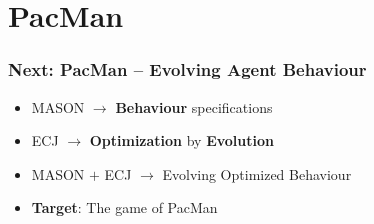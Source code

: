 \documentclass{beamer}
\begin{document}
\section{PacMan}
\begin{frame}
	\frametitle{Next: PacMan -- Evolving Agent Behaviour}
	\begin{block}{}
		\begin{itemize}
			\setlength{\itemsep}{0.75cm}
			\item MASON $\rightarrow$ \textbf{Behaviour} specifications
			\item ECJ $\rightarrow$ \textbf{Optimization} by \textbf{Evolution}
			\item MASON $+$ ECJ $\rightarrow$ Evolving Optimized Behaviour
			\item \textbf{Target}: The game of PacMan 
		\end{itemize}
	\end{block}
\end{frame}

\end{document}
